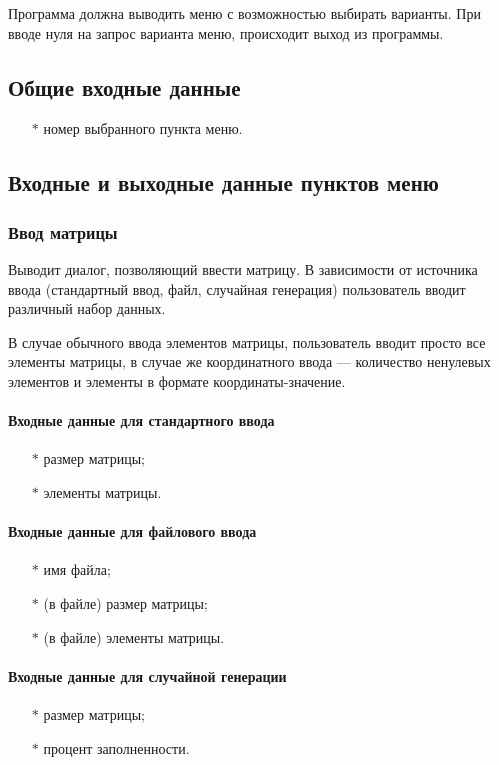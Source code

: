 \documentclass[a4paper,12pt]{extarticle}
\begin{document}
Программа должна выводить меню с возможностью выбирать варианты. При вводе нуля на запрос варианта меню, происходит выход из программы.

\subsection{Общие входные данные}
\begin{itemize}
    \item[$*$] номер выбранного пункта меню.
\end{itemize}

\subsection{Входные и выходные данные пунктов меню}
\subsubsection{Ввод матрицы}
Выводит диалог, позволяющий ввести матрицу. В зависимости от источника ввода (стандартный ввод, файл, случайная генерация) пользователь вводит различный набор данных.

В случае обычного ввода элементов матрицы, пользователь вводит просто все элементы матрицы, в случае же координатного ввода --- количество ненулевых элементов и элементы в формате координаты-значение.

\paragraph{Входные данные для стандартного ввода}
\begin{itemize}
    \item[$*$] размер матрицы;
    \item[$*$] элементы матрицы.
\end{itemize}

\paragraph{Входные данные для файлового ввода}
\begin{itemize}
    \item[$*$] имя файла;
    \item[$*$] (в файле) размер матрицы;
    \item[$*$] (в файле) элементы матрицы.
\end{itemize}

\paragraph{Входные данные для случайной генерации}
\begin{itemize}
    \item[$*$] размер матрицы;
    \item[$*$] процент заполненности.
\end{itemize}
\end{document}
